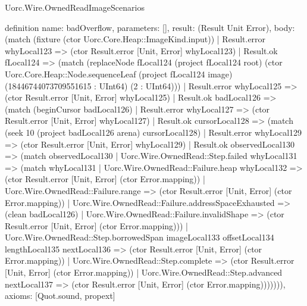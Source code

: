 \begin{lexlean}{Uorc.Wire.OwnedReadImageScenarios}
\begin{semanticmodule}
definition{
  name: badOverflow,
  parameters: [],
  result: (Result Unit Error),
  body: (match (fixture (ctor Uorc.Core.Heap::ImageKind.input))
    | Result.error whyLocal123 => (ctor Result.error [Unit, Error] whyLocal123)
    | Result.ok fLocal124 => (match (replaceNode fLocal124 (project fLocal124 root) (ctor Uorc.Core.Heap::Node.sequenceLeaf (project fLocal124 image) (18446744073709551615 : UInt64) (2 : UInt64)))
      | Result.error whyLocal125 => (ctor Result.error [Unit, Error] whyLocal125)
      | Result.ok badLocal126 => (match (beginCursor badLocal126)
        | Result.error whyLocal127 => (ctor Result.error [Unit, Error] whyLocal127)
        | Result.ok cursorLocal128 => (match (seek 10 (project badLocal126 arena) cursorLocal128)
          | Result.error whyLocal129 => (ctor Result.error [Unit, Error] whyLocal129)
          | Result.ok observedLocal130 => (match observedLocal130
            | Uorc.Wire.OwnedRead::Step.failed whyLocal131 => (match whyLocal131
              | Uorc.Wire.OwnedRead::Failure.heap whyLocal132 => (ctor Result.error [Unit, Error] (ctor Error.mapping))
              | Uorc.Wire.OwnedRead::Failure.range => (ctor Result.error [Unit, Error] (ctor Error.mapping))
              | Uorc.Wire.OwnedRead::Failure.addressSpaceExhausted => (clean badLocal126)
              | Uorc.Wire.OwnedRead::Failure.invalidShape => (ctor Result.error [Unit, Error] (ctor Error.mapping)))
            | Uorc.Wire.OwnedRead::Step.borrowedSpan imageLocal133 offsetLocal134 lengthLocal135 nextLocal136 => (ctor Result.error [Unit, Error] (ctor Error.mapping))
            | Uorc.Wire.OwnedRead::Step.complete => (ctor Result.error [Unit, Error] (ctor Error.mapping))
            | Uorc.Wire.OwnedRead::Step.advanced nextLocal137 => (ctor Result.error [Unit, Error] (ctor Error.mapping))))))),
  axioms: [Quot.sound, propext]
}


\end{semanticmodule}
\end{lexlean}
